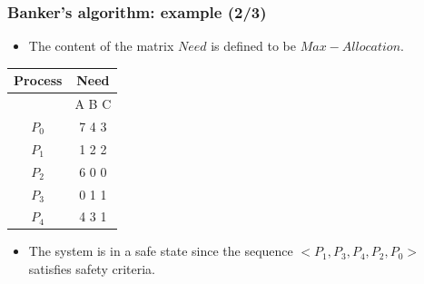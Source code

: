 \documentclass[CJKutf8,xcolor=pdftex,dvipsnames,table]{beamer}
\begin{document}
\begin{CJK*}{UTF8}{song}
  \begin{frame}
  \frametitle{Banker's algorithm: example (2/3)} \pause
  \begin{itemize}
  \item{The content of the matrix $Need$ is defined to be $Max - Allocation$.} \pause
  \end{itemize}
  \begin{tabular}{cc}
    Process & Need\\
    \hline
            & A B C\\
    $P_0$   & 7 4 3\\
    $P_1$   & 1 2 2\\
    $P_2$   & 6 0 0\\
    $P_3$   & 0 1 1\\
    $P_4$   & 4 3 1\\
  \end{tabular} \pause
  \begin{itemize}
  \item{The system is in a safe state since the sequence $<P_1, P_3, P_4, P_2, P_0>$ satisfies safety criteria.}
  \end{itemize}
  \end{frame}
  

\end{CJK*}
\end{document}
